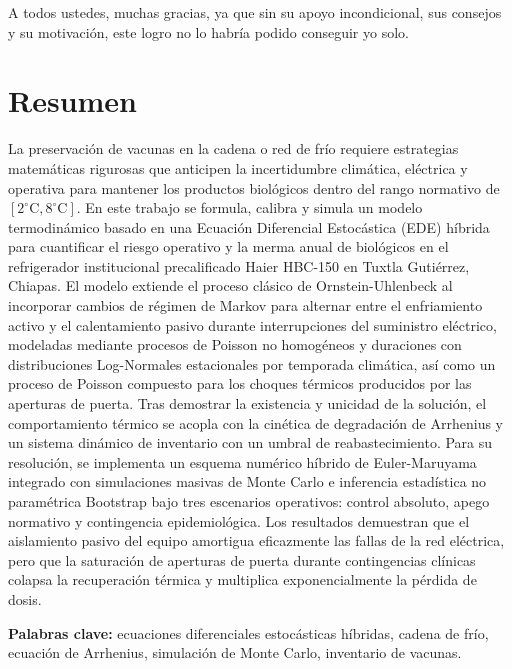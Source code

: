\documentclass[
  spanish,
  us-letterpaper,
]{scrreprt}
\numberwithin{equation}{section}
\renewcommand*\contentsname{Tabla de contenidos}
\newcommand\contentsname{Tabla de contenidos}
\theoremstyle{plain}
\theoremstyle{plain}
\theoremstyle{definition}
\theoremstyle{plain}
\theoremstyle{remark}
\begin{document}
A todos ustedes, muchas gracias, ya que sin su apoyo incondicional, sus consejos y su motivación, este logro no lo habría podido conseguir yo solo.
\renewcommand*\contentsname{Tabla de contenidos}
{
\hypersetup{linkcolor=}
\setcounter{tocdepth}{2}
\tableofcontents
}


\chapter{Resumen}\label{resumen}

La preservación de vacunas en la cadena o red de frío requiere
estrategias matemáticas rigurosas que anticipen la incertidumbre
climática, eléctrica y operativa para mantener los productos biológicos
dentro del rango normativo de \([2^\circ\text{C}, 8^\circ\text{C}]\). En
este trabajo se formula, calibra y simula un modelo termodinámico basado
en una Ecuación Diferencial Estocástica (EDE) híbrida para cuantificar
el riesgo operativo y la merma anual de biológicos en el refrigerador
institucional precalificado Haier HBC-150 en Tuxtla Gutiérrez, Chiapas.
El modelo extiende el proceso clásico de Ornstein-Uhlenbeck al
incorporar cambios de régimen de Markov para alternar entre el
enfriamiento activo y el calentamiento pasivo durante interrupciones del
suministro eléctrico, modeladas mediante procesos de Poisson no
homogéneos y duraciones con distribuciones Log-Normales estacionales por
temporada climática, así como un proceso de Poisson compuesto para los
choques térmicos producidos por las aperturas de puerta. Tras demostrar
la existencia y unicidad de la solución, el comportamiento térmico se
acopla con la cinética de degradación de Arrhenius y un sistema dinámico
de inventario con un umbral de reabastecimiento. Para su resolución, se
implementa un esquema numérico híbrido de Euler-Maruyama integrado con
simulaciones masivas de Monte Carlo e inferencia estadística no
paramétrica Bootstrap bajo tres escenarios operativos: control absoluto,
apego normativo y contingencia epidemiológica. Los resultados demuestran
que el aislamiento pasivo del equipo amortigua eficazmente las fallas de
la red eléctrica, pero que la saturación de aperturas de puerta durante
contingencias clínicas colapsa la recuperación térmica y multiplica
exponencialmente la pérdida de dosis.

\textbf{Palabras clave:} ecuaciones diferenciales estocásticas híbridas,
cadena de frío, ecuación de Arrhenius, simulación de Monte Carlo,
inventario de vacunas.
\end{document}
